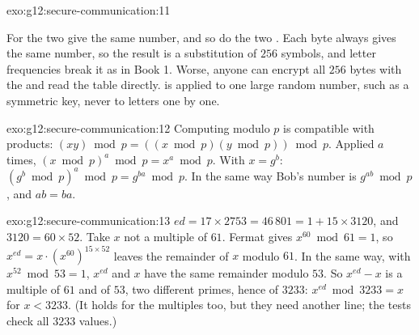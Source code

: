 \begin{solution}{exo:g12:secure-communication:11}
\smallskip\noindent\hspace*{2em}

\noindent\hspace*{4em}

\smallskip\noindent For  the two  give the same number, and so do the two . Each byte
always gives the same number, so the result is a substitution of $256$ symbols, and letter frequencies break it as
in Book 1. Worse, anyone can encrypt all $256$ bytes with the  and read the table directly.  is applied to one large random number, such as a symmetric key, never to letters one by one.
\end{solution}

\begin{solution}{exo:g12:secure-communication:12}
Computing modulo $p$ is compatible with products: $(xy) \bmod p = ((x \bmod p)(y \bmod p)) \bmod p$. Applied $a$
times, $(x \bmod p)^a \bmod p = x^a \bmod p$. With $x = g^b$: $(g^b \bmod p)^a \bmod p = g^{ba} \bmod p$. In the same
way Bob's number is $g^{ab} \bmod p$, and $ab = ba$.
\end{solution}

\begin{solution}{exo:g12:secure-communication:13}
$ed = 17 \times 2753 = 46\,801 = 1 + 15 \times 3120$, and $3120 = 60 \times 52$. Take $x$ not a multiple of $61$.
Fermat gives $x^{60} \bmod 61 = 1$, so $x^{ed} = x \cdot (x^{60})^{15 \times 52}$ leaves the remainder of $x$ modulo
$61$. In the same way, with $x^{52} \bmod 53 = 1$, $x^{ed}$ and $x$ have the same remainder modulo $53$. So
$x^{ed} - x$ is a multiple of $61$ and of $53$, two different primes, hence of $3233$: $x^{ed} \bmod 3233 = x$ for
$x < 3233$. (It holds for the multiples too, but they need another line; the tests check all $3233$ values.)
\end{solution}

